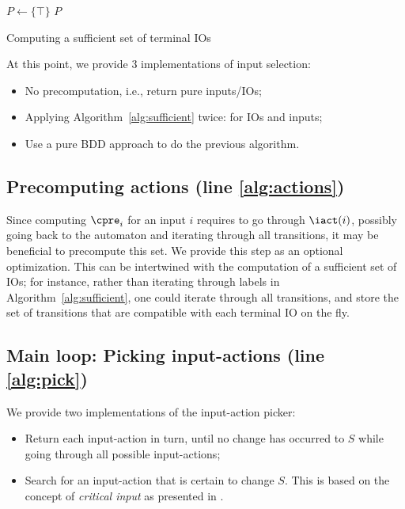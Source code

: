 \documentclass[runningheads,a4paper,draft]{llncs}
\begin{document}
\begin{algorithm}

\BlankLine
\(P \leftarrow \{\top\}\)\;
\Return \(P\)
\caption{Computing a sufficient set of terminal IOs}
\label{alg:sufficient}
\end{algorithm}

At this point, we provide 3 implementations of input selection:
\begin{itemize}
\item No precomputation, i.e., return pure inputs/IOs;
\item Applying Algorithm~\ref{alg:sufficient} twice: for IOs and inputs;
\item Use a pure BDD approach to do the previous algorithm.
\end{itemize}

\subsection{Precomputing actions (line \ref{alg:actions})}

Since computing \(\cpre_i\) for an input \(i\) requires to go through
\(\iact(i)\), possibly going back to the automaton and iterating through all
transitions, it may be beneficial to precompute this set.  We provide this step
as an optional optimization.  This can be intertwined with the computation of a
sufficient set of IOs; for instance, rather than iterating through labels in
Algorithm~\ref{alg:sufficient}, one could iterate through all transitions, and
store the set of transitions that are compatible with each terminal IO on the
fly.

\subsection{Main loop: Picking input-actions (line \ref{alg:pick})}

We provide two implementations of the input-action picker:
\begin{itemize}
\item Return each input-action in turn, until no change has occurred to \(S\)
  while going through all possible input-actions;
\item Search for an input-action that is certain to change \(S\).  This is based
  on the concept of \emph{critical input} as presented in \cite{bohy14}.
\end{itemize}
\end{document}
